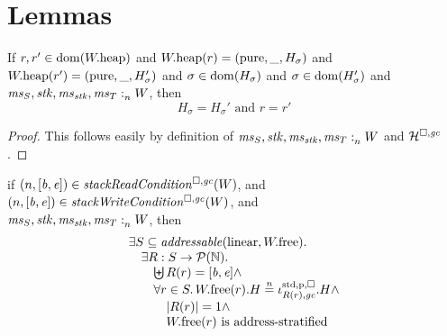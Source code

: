 \documentclass[a4paper]{article}
\begin{document}
\section{Lemmas}
\begin{lemma}
  \label{lem:unique-h-sigma}
  If $r,r' \in \mathrm{dom}(W.\mathrm{heap})$ and $W.\mathrm{heap}(r) = (\mathrm{pure},\_,H_\sigma)$
  and $W.\mathrm{heap}(r') = (\mathrm{pure},\_,H_\sigma')$ and $\sigma \in \mathrm{dom}(H_\sigma)$
  and $\sigma \in \mathrm{dom}(H_\sigma')$ and $\mathit{ms}_S,\mathit{stk},\mathit{ms}_{\mathit{stk}},\mathit{ms}_T :_{n}^{}W$,
  then
  \[
    H_\sigma = H_\sigma' \text{ and } r = r'
  \]
\end{lemma}
\begin{proof}
  This follows easily by definition of $\mathit{ms}_S,\mathit{stk},\mathit{ms}_{\mathit{stk}},\mathit{ms}_T :_{n}^{}W$ and $\mathcal{H}^{\square,\mathit{gc}}$.
\end{proof}

\begin{lemma}
  if $\npair{[\baddr,\eaddr]} \in \stackReadCond{W}$, and
  $\npair{[\baddr,\eaddr]} \in \stackWriteCond{W}$, and\\
  $\mathit{ms}_S,\mathit{stk},\mathit{ms}_{\mathit{stk}},\mathit{ms}_T :_{n}^{}W$, then
  \[
    \begin{array}{l}
      \exists S \subseteq \addressable{\linear,\pwfree} \ldotp \\
      \quad \exists R : S \fun \powerset{\nats} \ldotp \\
      \qquad \biguplus R(r) = [\baddr,\eaddr] \wedge \\
      \qquad \forall r \in S \ldotp \pwfree(r).H \nequal \stdreg{R(r),\gc}{\pur}.H \wedge \\
      \qquad \quad |R(r)| = 1 \wedge \\
      \qquad \quad \pwfree(r) \text{ is address-stratified}
    \end{array}
  \]
\end{lemma}
\end{document}
